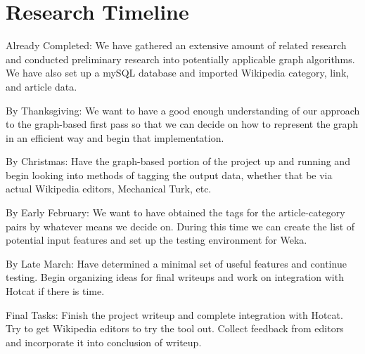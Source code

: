 \documentclass{sig-alternate}
\begin{document}
\section{Research Timeline}
\label{sec:research_timeline}
\begin{itemize*}
	\item {\sc Already Completed}: We have gathered an extensive amount of related research and conducted preliminary research into potentially applicable graph algorithms. We have also set up a mySQL database and imported Wikipedia category, link, and article data.\vspace{3pt}
	\item {\sc By Thanksgiving}: We want to have a good enough understanding of our approach to the graph-based first pass so that we can decide on how to represent the graph in an efficient way and begin that implementation.\vspace{3pt}
	\item {\sc By Christmas}: Have the graph-based portion of the project up and running and begin looking into methods of tagging the output data, whether that be via actual Wikipedia editors, Mechanical Turk, etc.\vspace{3pt}
	\item {\sc By Early February}: We want to have obtained the tags for the article-category pairs by whatever means we decide on. During this time we can create the list of potential input features and set up the testing environment for Weka.\vspace{3pt}
	\item {\sc By Late March}: Have determined a minimal set of useful features and continue testing. Begin organizing ideas for final writeups and work on integration with Hotcat if there is time.\vspace{3pt}
	\item {\sc Final Tasks}: Finish the project writeup and complete integration with Hotcat. Try to get Wikipedia editors to try the tool out. Collect feedback from editors and incorporate it into conclusion of writeup.
\end{itemize*}

\nocite{*}
\end{document}
